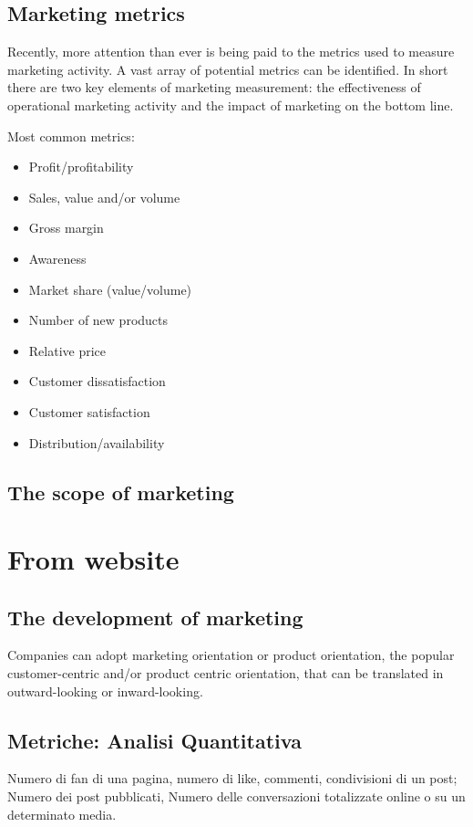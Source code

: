 \documentclass{article}
\begin{document}
\subsection{Marketing metrics}
Recently, more attention than ever is being paid to the metrics used to measure marketing activity. A vast array of potential metrics can be identified. In short there are two key elements of marketing measurement: the effectiveness of operational marketing activity and the impact of marketing on the bottom line. 

Most common metrics:
\begin{itemize}
    \item Profit/profitability
    \item Sales, value and/or volume
    \item Gross margin
    \item Awareness
    \item Market share (value/volume)
    \item Number of new products
    \item Relative price
    \item Customer dissatisfaction
    \item Customer satisfaction
    \item Distribution/availability
\end{itemize}

\subsection{The scope of marketing}

\section{From website}
\subsection{The development of marketing}
Companies can adopt marketing orientation or product orientation, the popular customer-centric and/or product centric orientation, that can be translated in outward-looking or inward-looking. 

\subsection{Metriche: Analisi Quantitativa}
Numero di fan di una pagina, numero di like, commenti, condivisioni di un post; Numero dei post pubblicati, Numero delle conversazioni totalizzate online o su un determinato media.
\end{document}
